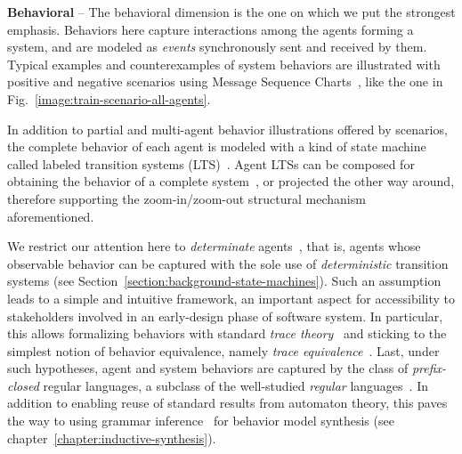 \noindent \textbf{Behavioral} -- The behavioral dimension is the one on which we put the strongest emphasis. Behaviors here capture interactions among the agents forming a system, and are modeled as \emph{events} synchronously sent and received by them. Typical examples and counterexamples of system behaviors are illustrated with positive and negative scenarios using Message Sequence Charts~\cite{ITU:1996}, like the one in Fig.~\ref{image:train-scenario-all-agents}.

In addition to partial and multi-agent behavior illustrations offered by scenarios, the complete behavior of each agent is modeled with a kind of state machine called labeled transition systems (LTS)~\cite{Keller:1976, Milner:1989}. Agent LTSs can be composed for obtaining the behavior of a complete system~\cite{Hoare:1985}, or projected the other way around, therefore supporting the zoom-in/zoom-out structural mechanism aforementioned.

We restrict our attention here to \emph{determinate} agents~\cite{Engelfriet:1985}, that is, agents whose observable behavior can be captured with the sole use of \emph{deterministic} transition systems (see Section~\ref{section:background-state-machines}). Such an assumption leads to a simple and intuitive framework, an important aspect for accessibility to stakeholders involved in an early-design phase of software system. In particular, this allows formalizing behaviors with standard \emph{trace theory}~\cite{Hoare:1985} and sticking to the simplest notion of behavior equivalence, namely \emph{trace equivalence}~\cite{Engelfriet:1985}. Last, under such hypotheses, agent and system behaviors are captured by the class of \emph{prefix-closed} regular languages, a subclass of the well-studied \emph{regular} languages~\cite{Hopcroft:1979, Aho:1986}. In addition to enabling reuse of standard results from automaton theory, this paves the way to using grammar inference~\cite{Gold:1978} for behavior model synthesis (see chapter~\ref{chapter:inductive-synthesis}). 
